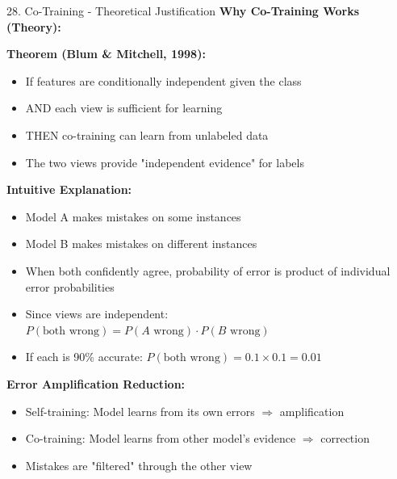 \documentclass[8pt]{beamer}
\begin{document}
	\begin{frame}{28. Co-Training - Theoretical Justification}
		\fontsize{6.5}{7.5}\selectfont
		\textbf{Why Co-Training Works (Theory):}
		
		\textbf{Theorem (Blum \& Mitchell, 1998):}
		\begin{itemize}
			\item If features are conditionally independent given the class
			\item AND each view is sufficient for learning
			\item THEN co-training can learn from unlabeled data
			\item The two views provide "independent evidence" for labels
		\end{itemize}
		
		\textbf{Intuitive Explanation:}
		\begin{itemize}
			\item Model A makes mistakes on some instances
			\item Model B makes mistakes on different instances
			\item When both confidently agree, probability of error is product of individual error probabilities
			\item Since views are independent: $P(\text{both wrong}) = P(A\text{ wrong}) \cdot P(B\text{ wrong})$
			\item If each is 90\% accurate: $P(\text{both wrong}) = 0.1 \times 0.1 = 0.01$
		\end{itemize}
		
		\textbf{Error Amplification Reduction:}
		\begin{itemize}
			\item Self-training: Model learns from its own errors $\Rightarrow$ amplification
			\item Co-training: Model learns from other model's evidence $\Rightarrow$ correction
			\item Mistakes are "filtered" through the other view
		\end{itemize}
	\end{frame}
	
\end{document}
